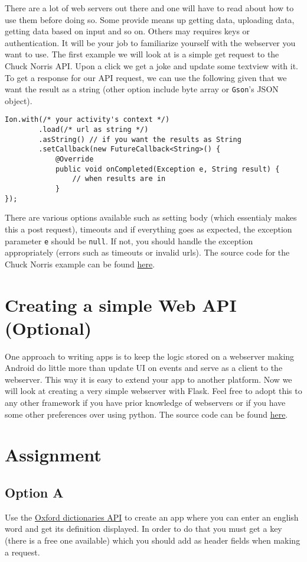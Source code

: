 There are a lot of web servers out there and one will have to read about how to use them before doing so. Some provide means up getting data, uploading data, getting data based on input and so on. Others may requires keys or authentication. It will be your job to familiarize yourself with the webserver you want to use. The first example we will look at is a simple get request to the Chuck Norris API. Upon a click we get a joke and update some textview with it. To get a response for our API request, we can use the following given that we want the result as a string (other option include byte array or \texttt{Gson}'s JSON object).
\begin{lstlisting}[style=A_Java]
Ion.with(/* your activity's context */)
        .load(/* url as string */)
        .asString() // if you want the results as String
        .setCallback(new FutureCallback<String>() {
            @Override
            public void onCompleted(Exception e, String result) {
                // when results are in
            }
});
\end{lstlisting}
There are various options available such as setting body (which essentialy makes this a post request), timeouts and if everything goes as expected, the exception parameter \texttt{e} should be \texttt{null}. If not, you should handle the exception appropriately (errors such as timeouts or invalid urls). The source code for the Chuck Norris example can be found \href{www.todo.com}{here}.\\


\section{Creating a simple Web API (Optional)}
One approach to writing apps is to keep the logic stored on a webserver making Android do little more than update UI on events and serve as a client to the webserver. This way it is easy to extend your app to another platform. Now we will look at creating a very simple webserver with Flask. Feel free to adopt this to any other framework if you have prior knowledge of webservers or if you have some other preferences over using python. The source code can be found \href{www.todo.com}{here}.

\section{Assignment}


\subsection{Option A}
Use the \href{https://developer.oxforddictionaries.com}{Oxford dictionaries API} to create an app where you can enter an english word and get its definition displayed. In order to do that you must get a key (there is a free one available) which you should add as header fields when making a request.

